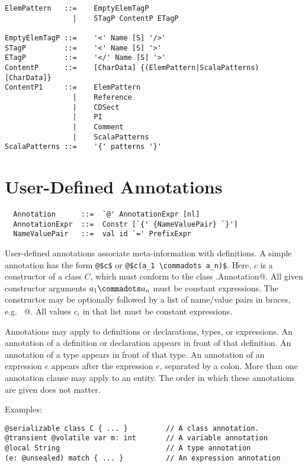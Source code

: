 {\syntax\begin{lstlisting}
ElemPattern   ::=    EmptyElemTagP
                |    STagP ContentP ETagP                                    

EmptyElemTagP ::=    '<' Name [S] '/>'
STagP         ::=    '<' Name [S] '>'                          
ETagP         ::=    '</' Name [S] '>'                                        
ContentP      ::=    [CharData] {(ElemPattern|ScalaPatterns) [CharData]}
ContentP1     ::=    ElemPattern
                |    Reference
                |    CDSect
                |    PI
                |    Comment
                |    ScalaPatterns
ScalaPatterns ::=    '{' patterns '}'
\end{lstlisting}


\chapter{User-Defined Annotations}
\label{sec:annotations}

\syntax\begin{lstlisting}
  Annotation      ::=  `@' AnnotationExpr [nl]
  AnnotationExpr  ::=  Constr [`{' {NameValuePair} `}']
  NameValuePair   ::=  val id `=' PrefixExpr
\end{lstlisting}

User-defined annotations associate meta-information with definitions.
A simple annotation has the form \lstinline^@$c$^ or
\lstinline^@$c(a_1 \commadots a_n)$^.  
Here, $c$ is a constructor of a class $C$, which must conform
to the class \lstinline@scala.Annotation@. All given constructor
arguments $a_1 \commadots a_n$ must be constant expressions. The
constructor may be optionally followed by a list of name/value pairs
in braces, e.g.  ~@. All
values $c_i$ in that list must be constant expressions.

Annotations may apply to definitions or declarations, types, or
expressions.  An annotation of a definition or declaration appears in
front of that definition.  An annotation of a type appears in front of
that type. An annotation of an expression $e$ appears after the
expression $e$, separated by a colon. More than one annotation clause
may apply to an entity. The order in which these annotations are given
does not matter.

Examples:
\begin{lstlisting}
@serializable class C { ... }         // A class annotation.
@transient @volatile var m: int       // A variable annotation
@local String                         // A type annotation
(e: @unsealed) match { ... }          // An expression annotation
\end{lstlisting}

}
